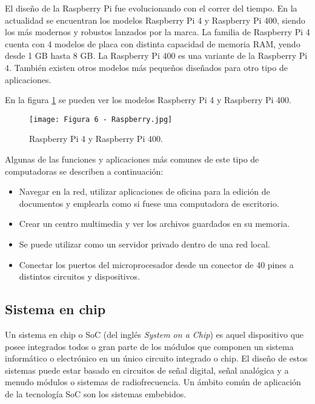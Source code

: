 El diseño de la Raspberry Pi fue evolucionando con el correr del tiempo. En la actualidad se encuentran los modelos Raspberry Pi 4 y Raspberry Pi 400, siendo los más modernos y robustos lanzados por la marca. La familia de Raspberry Pi 4 cuenta con 4 modelos de placa con distinta capacidad de memoria RAM, yendo desde 1 GB hasta 8 GB. La Raspberry Pi 400 es una variante de la Raspberry Pi 4. También existen otros modelos más pequeños diseñados para otro tipo de aplicaciones.

En la figura \ref{fig:7} se pueden ver los modelos Raspberry Pi 4 y Raspberry Pi 400.

\begin{figure}[h]
\centering
\texttt{[image: Figura 6 - Raspberry.jpg]}
\caption[Raspberry Pi]{Raspberry Pi 4 y Raspberry Pi 400. \footnotemark}
\label{fig:7}
\end{figure}

Algunas de las funciones y aplicaciones más comunes de este tipo de computadoras se describen a continuación:

\begin{itemize}
	\item Navegar en la red, utilizar aplicaciones de oficina para la edición de documentos y emplearla como si fuese una computadora de escritorio.
	\item Crear un centro multimedia y ver los archivos guardados en su memoria.
	\item Se puede utilizar como un servidor privado dentro de una red local.
	\item Conectar los puertos del microprocesador desde un conector de 40 pines a distintos circuitos y dispositivos.
\end{itemize}

\subsection{Sistema en chip}

Un sistema en chip o SoC (del inglés \textit{System on a Chip}) es aquel dispositivo que posee integrados todos o gran parte de los módulos que componen un sistema informático o electrónico en un único circuito integrado o chip. El diseño de estos sistemas puede estar basado en circuitos de señal digital, señal analógica y a menudo módulos o sistemas de radiofrecuencia. Un ámbito común de aplicación de la tecnología SoC son los sistemas embebidos.

